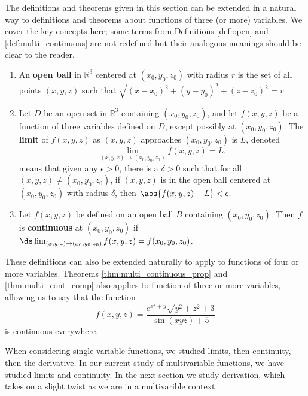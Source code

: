 The definitions and theorems given in this section can be extended in a natural way to definitions and theorems about functions of three (or more) variables. We cover the key concepts here; some terms from Definitions \ref{def:open} and \ref{def:multi_continuous} are not redefined but their analogous meanings should be clear to the reader.

\setboxwidth{20pt}
{\begin{enumerate}
\item An \textbf{open ball} in $\mathbb{R}^3$ centered at $(x_0,y_0,z_0)$ with radius $r$ is the set of all points $(x,y,z)$ such that $\sqrt{(x-x_0)^2+(y-y_0)^2+(z-z_0)^2} = r$.
\\

\item Let $D$ be an open set in $\mathbb{R}^3$ containing $(x_0,y_0,z_0)$, and let $f(x,y,z)$ be a function of three variables defined on $D$, except possibly at  $(x_0,y_0,z_0)$. The \textbf{limit} of $f(x,y,z)$ as $(x,y,z)$ approaches $(x_0,y_0,z_0)$ is $L$, denoted 
\[\lim_{(x,y,z)\to (x_0,y_0,z_0)} f(x,y,z) = L,\]
means that given any $\epsilon >0$, there is a $\delta >0$ such that for all  $(x,y,z)\neq(x_0,y_0,z_0)$, if $(x,y,z)$ is in the open ball centered at $(x_0,y_0,z_0)$ with radius $\delta$, then $\abs{f(x,y,z) - L}< \epsilon$.\\

\item Let $f(x,y,z)$ be defined on an open ball $B$ containing $(x_0,y_0,z_0)$. Then $f$ is \textbf{continuous} at $(x_0,y_0,z_0)$ if $\ds \lim_{(x,y,z)\to (x_0,y_0,z_0)} f(x,y,z) = f(x_0,y_0,z_0)$.
\end{enumerate}}

These definitions can also be extended naturally to apply to functions of four or more variables. Theorems \ref{thm:multi_continuous_prop} and \ref{thm:multi_cont_comp} also applies to function of three or more variables, allowing us to say that the function
\[f(x,y,z) = \frac{e^{x^2+y}\sqrt{y^2+z^2+3}}{\sin (xyz)+5}\]
is continuous everywhere.

When considering single variable functions, we studied limits, then continuity, then the derivative. In our current study of multivariable functions, we have studied limits and continuity. In the next section we study derivation, which takes on a slight twist as we are in a multivarible context.


